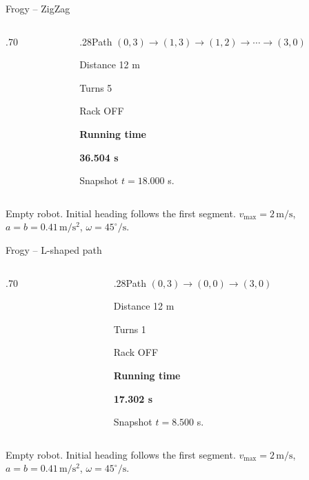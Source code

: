 \begin{frame}{Frogy -- ZigZag}
\begin{columns}[T,onlytextwidth]
\begin{column}{.70\textwidth}\end{column}
\begin{column}{.28\textwidth}\small Path $(0,3)\to(1,3)\to(1,2)\to\cdots\to(3,0)$\par\medskip Distance 12 m\par Turns 5\par Rack OFF\par\medskip\textbf{Running time}\par\textbf{36.504 s}\par\medskip Snapshot $t=18.000$ s.\end{column}
\end{columns}
\vspace{1mm}
{\tiny\texttt{}\par \texttt{}\par Empty robot. Initial heading follows the first segment. $v_{\max}=2\,\mathrm{m/s}$, $a=b=0.41\,\mathrm{m/s^2}$, $\omega=45^\circ/\mathrm{s}$.}
\end{frame}

\begin{frame}{Frogy -- L-shaped path}
\begin{columns}[T,onlytextwidth]
\begin{column}{.70\textwidth}\end{column}
\begin{column}{.28\textwidth}\small Path $(0,3)\to(0,0)\to(3,0)$\par\medskip Distance 12 m\par Turns 1\par Rack OFF\par\medskip\textbf{Running time}\par\textbf{17.302 s}\par\medskip Snapshot $t=8.500$ s.\end{column}
\end{columns}
\vspace{1mm}
{\tiny\texttt{}\par \texttt{}\par Empty robot. Initial heading follows the first segment. $v_{\max}=2\,\mathrm{m/s}$, $a=b=0.41\,\mathrm{m/s^2}$, $\omega=45^\circ/\mathrm{s}$.}
\end{frame}

